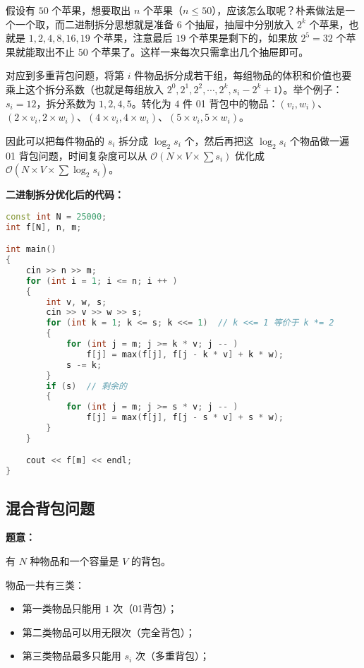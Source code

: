假设有 $50$ 个苹果，想要取出 $n$ 个苹果（$n \leq 50$），应该怎么取呢？朴素做法是一个一个取，而二进制拆分思想就是准备 $6$ 个抽屉，抽屉中分别放入 $2^k$ 个苹果，也就是 $1, 2, 4, 8, 16, 19$ 个苹果，注意最后 $19$ 个苹果是剩下的，如果放 $2^5 = 32$ 个苹果就能取出不止 $50$ 个苹果了。这样一来每次只需拿出几个抽屉即可。

对应到多重背包问题，将第 $i$ 件物品拆分成若干组，每组物品的体积和价值也要乘上这个拆分系数（也就是每组放入 $2^0, 2^1, 2^2, \cdots , 2^k, s_i - 2^k + 1$）。举个例子：$s_i = 12$，拆分系数为 $1, 2, 4, 5$。转化为 $4$ 件 01 背包中的物品：$(v_i, w_i)$、$(2 \times v_i, 2 \times w_i)$、$(4 \times v_i, 4 \times w_i)$、$(5 \times v_i, 5 \times w_i)$。

因此可以把每件物品的 $s_i$ 拆分成 $\log_2 s_i$ 个，然后再把这 $\log_2 s_i$ 个物品做一遍 01 背包问题，时间复杂度可以从 $\mathcal{O}(N \times V \times \sum s_i)$ 优化成 $\mathcal{O}(N \times V \times \sum \log_2 s_i)$。

\textbf{二进制拆分优化后的代码：}

\begin{lstlisting}[language=cpp]
const int N = 25000;
int f[N], n, m;

int main()
{
    cin >> n >> m;
    for (int i = 1; i <= n; i ++ ) 
    {
        int v, w, s;
        cin >> v >> w >> s;
        for (int k = 1; k <= s; k <<= 1)  // k <<= 1 等价于 k *= 2
        {
            for (int j = m; j >= k * v; j -- )
                f[j] = max(f[j], f[j - k * v] + k * w);
            s -= k;
        }
        if (s)  // 剩余的
        {
            for (int j = m; j >= s * v; j -- )
                f[j] = max(f[j], f[j - s * v] + s * w);
        }
    }

    cout << f[m] << endl;
}
\end{lstlisting}

\subsection{混合背包问题}

\textbf{题意：}

有 $N$ 种物品和一个容量是 $V$ 的背包。

物品一共有三类：

\begin{itemize}
\item 第一类物品只能用 $1$ 次（01背包）；
\item 第二类物品可以用无限次（完全背包）；
\item 第三类物品最多只能用 $s_i$ 次（多重背包）；
\end{itemize}

